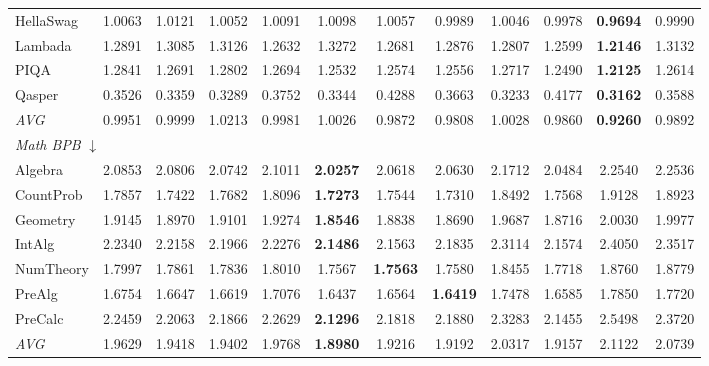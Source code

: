\begin{table}[htbp]
\begin{tabular}{lccccccccccc}
HellaSwag & 1.0063 & 1.0121 & 1.0052 & 1.0091 & 1.0098 & 1.0057 & 0.9989 & 1.0046 & 0.9978 & \textbf{0.9694} & 0.9990 \\
Lambada & 1.2891 & 1.3085 & 1.3126 & 1.2632 & 1.3272 & 1.2681 & 1.2876 & 1.2807 & 1.2599 & \textbf{1.2146} & 1.3132 \\
PIQA & 1.2841 & 1.2691 & 1.2802 & 1.2694 & 1.2532 & 1.2574 & 1.2556 & 1.2717 & 1.2490 & \textbf{1.2125} & 1.2614 \\
Qasper & 0.3526 & 0.3359 & 0.3289 & 0.3752 & 0.3344 & 0.4288 & 0.3663 & 0.3233 & 0.4177 & \textbf{0.3162} & 0.3588 \\
\textit{AVG} & 0.9951 & 0.9999 & 1.0213 & 0.9981 & 1.0026 & 0.9872 & 0.9808 & 1.0028 & 0.9860 & \textbf{0.9260} & 0.9892 \\
\midrule
\multicolumn{12}{l}{\textit{Math BPB} $\downarrow$} \\
Algebra & 2.0853 & 2.0806 & 2.0742 & 2.1011 & \textbf{2.0257} & 2.0618 & 2.0630 & 2.1712 & 2.0484 & 2.2540 & 2.2536 \\
CountProb & 1.7857 & 1.7422 & 1.7682 & 1.8096 & \textbf{1.7273} & 1.7544 & 1.7310 & 1.8492 & 1.7568 & 1.9128 & 1.8923 \\
Geometry & 1.9145 & 1.8970 & 1.9101 & 1.9274 & \textbf{1.8546} & 1.8838 & 1.8690 & 1.9687 & 1.8716 & 2.0030 & 1.9977 \\
IntAlg & 2.2340 & 2.2158 & 2.1966 & 2.2276 & \textbf{2.1486} & 2.1563 & 2.1835 & 2.3114 & 2.1574 & 2.4050 & 2.3517 \\
NumTheory & 1.7997 & 1.7861 & 1.7836 & 1.8010 & 1.7567 & \textbf{1.7563} & 1.7580 & 1.8455 & 1.7718 & 1.8760 & 1.8779 \\
PreAlg & 1.6754 & 1.6647 & 1.6619 & 1.7076 & 1.6437 & 1.6564 & \textbf{1.6419} & 1.7478 & 1.6585 & 1.7850 & 1.7720 \\
PreCalc & 2.2459 & 2.2063 & 2.1866 & 2.2629 & \textbf{2.1296} & 2.1818 & 2.1880 & 2.3283 & 2.1455 & 2.5498 & 2.3720 \\
\textit{AVG} & 1.9629 & 1.9418 & 1.9402 & 1.9768 & \textbf{1.8980} & 1.9216 & 1.9192 & 2.0317 & 1.9157 & 2.1122 & 2.0739 \\
\bottomrule
\end{tabular}
\end{table}
